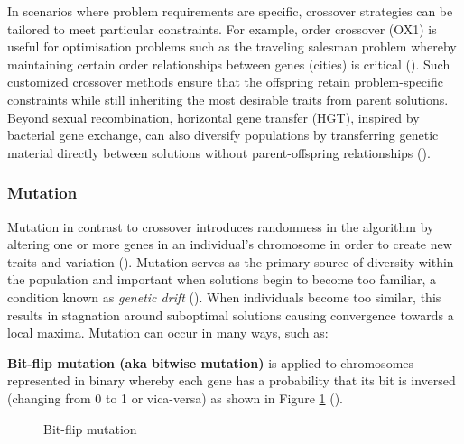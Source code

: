 \parbreak\noindent In scenarios where problem requirements are specific, crossover strategies can be tailored to meet particular constraints. For example, order crossover (OX1) is useful for optimisation problems such as the traveling salesman problem whereby maintaining certain order relationships between genes (cities) is critical (\cite{tsp}). Such customized crossover methods ensure that the offspring retain problem-specific constraints while still inheriting the most desirable traits from parent solutions. Beyond sexual recombination, horizontal gene transfer (HGT), inspired by bacterial gene exchange, can also diversify populations by transferring genetic material directly between solutions without parent-offspring relationships (\cite{hgt}).

\subsubsection{Mutation}\label{sec:ea_mutation}
Mutation in contrast to crossover introduces randomness in the algorithm by altering one or more genes in an individual's chromosome in order to create new traits and variation (\cite{evolutionaryComputingAndNeuralNetworks}). Mutation serves as the primary source of diversity within the population and important when solutions begin to become too familiar, a condition known as \textit{genetic drift} (\cite{advancesInEvolutionaryAlgorithms}). When individuals become too similar, this results in stagnation around suboptimal solutions causing convergence towards a local maxima. Mutation can occur in many ways, such as:

\parbreak\noindent \textbf{Bit-flip mutation (aka bitwise mutation)} is applied to chromosomes represented in binary whereby each gene has a probability that its bit is inversed (changing from 0 to 1 or vica-versa) as shown in Figure \ref{fig:bitflip} (\cite{intelligentOptimization}).
	
\parbreak
\begin{figure}[H] %
	\centering %
	\caption{Bit-flip mutation}
	\label{fig:bitflip} %
\end{figure}

